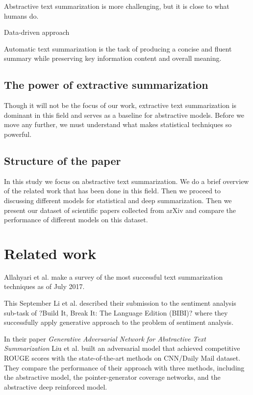 \documentclass[sigplan]{acmart}
\begin{document}
Abstractive text summarization is more challenging, but it is close to what humans do.

Data-driven approach

Automatic text summarization is the task of producing a concise and fluent summary while preserving key information content and overall meaning\cite{allahyari-17}.

\subsection{The power of extractive summarization}

Though it will not be the focus of our work, extractive text summarization is dominant in this field and serves as a baseline for abstractive models. Before we move any further, we must understand what makes statistical techniques so powerful.

\subsection{Structure of the paper}

In this study we focus on abstractive text summarization. We do a brief overview of the related work that has been done in this field. Then we proceed to discussing different models for statistical and deep summarization. Then we present our dataset of scientific papers collected from arXiv and compare the performance of different models on this dataset. 

\section{Related work}

Allahyari et al.\cite{allahyari-17} make a survey of the most successful text summarization techniques as of July 2017.

This September Li et al. \cite{li-cohn-17} described their submission to the sentiment analysis sub-task of ?Build It, Break It: The Language Edition (BIBI)? where they successfully apply generative approach to the problem of sentiment analysis.

In their paper \textit{Generative Adversarial Network for Abstractive Text Summarization} Liu et al.\cite{liu-17} built an adversarial model that achieved competitive ROUGE scores with the state-of-the-art methods on CNN/Daily Mail dataset. They compare the performance of their approach with three methods, including the abstractive model, the pointer-generator coverage networks, and the abstractive deep reinforced model.
\end{document}
